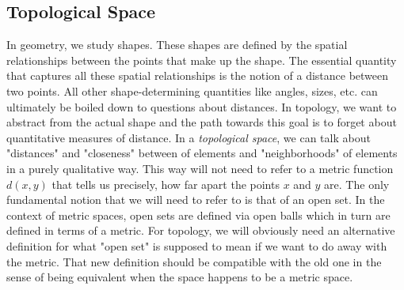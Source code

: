 





\subsection{Topological Space}
In geometry, we study shapes. These shapes are defined by the spatial relationships between the points that make up the shape. The essential quantity that captures all these spatial relationships is the notion of a distance between two points. All other shape-determining quantities like angles, sizes, etc. can ultimately be boiled down to questions about distances. In topology, we want to abstract from the actual shape and the path towards this goal is to forget about quantitative measures of distance. In a \emph{topological space}, we can talk about "distances" and "closeness" between of elements and "neighborhoods" of elements in a purely qualitative way. This way will not need to refer to a metric function $d(x,y)$ that tells us precisely, how far apart the points $x$ and $y$ are. The only fundamental notion that we will need to refer to is that of an open set. In the context of metric spaces, open sets are defined via open balls which in turn are defined in terms of a metric. For topology, we will obviously need an alternative definition for what "open set" is supposed to mean if we want to do away with the metric. That new definition should be compatible with the old one in the sense of being equivalent when the space happens to be a metric space.



